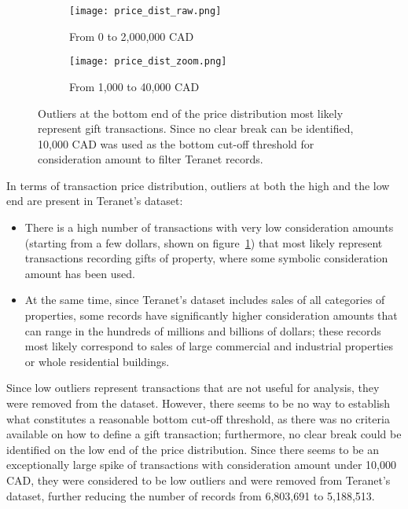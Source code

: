 \begin{figure}[ht]
    \centering
    \begin{subfigure}{\linewidth}
        \centering
        \texttt{[image: price\_dist\_raw.png]}
        \caption{From 0 to 2,000,000 CAD}
    \end{subfigure}

    \begin{subfigure}{\linewidth}
        \centering
        \texttt{[image: price\_dist\_zoom.png]}
        \caption{From 1,000 to 40,000 CAD}
    \end{subfigure}
    \caption{Outliers at the bottom end of the price distribution most likely represent gift transactions.
    Since no clear break can be identified, 10,000 CAD was used as the bottom cut-off threshold for consideration amount to filter Teranet records.}
    \label{fig:bottom_outliers}
\end{figure}

In terms of transaction price distribution, outliers at both the high and the low end are present in Teranet's dataset:
\begin{itemize}
    \item There is a high number of transactions with very low consideration amounts (starting from a few dollars, shown on figure~\ref{fig:bottom_outliers}) that most likely represent transactions recording gifts of property, where some symbolic consideration amount has been used.
    \item At the same time, since Teranet's dataset includes sales of all categories of properties, some records have significantly higher consideration amounts that can range in the hundreds of millions and billions of dollars;
    these records most likely correspond to sales of large commercial and industrial properties or whole residential buildings.
\end{itemize}

Since low outliers represent transactions that are not useful for analysis, they were removed from the dataset.
However, there seems to be no way to establish what constitutes a reasonable bottom cut-off threshold, as there was no criteria available on how to define a gift transaction;
furthermore, no clear break could be identified on the low end of the price distribution.
Since there seems to be an exceptionally large spike of transactions with consideration amount under 10,000 CAD, they were considered to be low outliers and were removed from Teranet's dataset, further reducing the number of records from 6,803,691 to 5,188,513.

